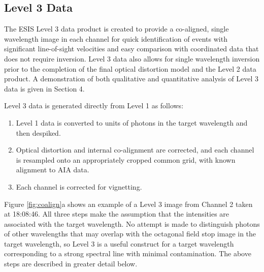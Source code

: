 \subsection{Level 3 Data} \label{sec:level 3}
 
    
\newcommand{\vigfit}{[.35, 0.28, 0.34, 0.6]}
\newcommand{\levthreetime}{18:08:46}

The ESIS Level 3 data product is created to provide a co-aligned, single wavelength image in each channel for quick identification of events with significant line-of-sight velocities and easy comparison with coordinated data that does not require inversion. 
Level 3 data also allows for single wavelength inversion prior to the completion of the final optical distortion model and the Level 2 data product.  A demonstration of both qualitative and quantitative analysis of Level 3 data is given in Section 4.  

Level 3 data is generated directly from Level 1 as follows:
\begin{enumerate}
    \item Level 1 data is converted to units of photons in the target wavelength and then despiked.\label{step:photons}
    \item Optical distortion and internal co-alignment are corrected, and each channel is resampled onto an appropriately cropped common grid, with known alignment to AIA data.\label{step:distortion}
    \item Each channel is corrected for vignetting.\label{step:vignetting}
\end{enumerate}
Figure \ref{fig:coalign}a shows an example of a Level 3 image from Channel 2 taken at \levthreetime. All three steps make the assumption that the intensities are associated with the target wavelength. No attempt is made to distinguish photons of other wavelengths that may overlap with the octagonal field stop image in the target wavelength, so Level 3 is a useful construct for a target wavelength corresponding to a strong spectral line with minimal contamination. The above steps are described in greater detail below.




